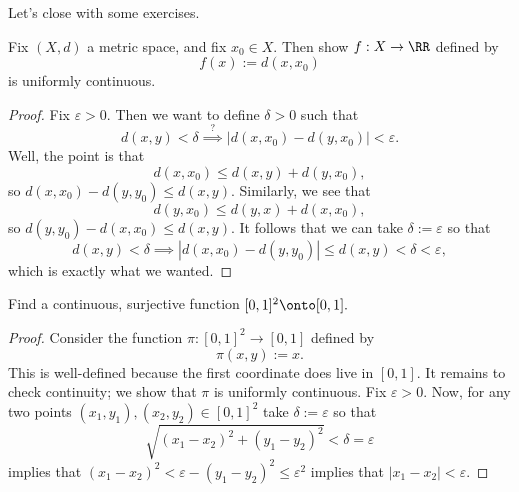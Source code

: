 \documentclass[../notes.tex]{subfiles}
\begin{document}
Let's close with some exercises.
\begin{exercise}
	Fix $(X,d)$ a metric space, and fix $x_0\in X.$ Then show $f:X\to\RR$ defined by
	\[f(x):=d(x,x_0)\]
	is uniformly continuous.
\end{exercise}
\begin{proof}
	Fix $\varepsilon>0.$ Then we want to define $\delta>0$ such that
	\[d(x,y)<\delta\stackrel?\implies|d(x,x_0)-d(y,x_0)|<\varepsilon.\]
	Well, the point is that
	\[d(x,x_0)\le d(x,y)+d(y,x_0),\]
	so $d(x,x_0)-d(y,y_0)\le d(x,y).$ Similarly, we see that
	\[d(y,x_0)\le d(y,x)+d(x,x_0),\]
	so $d(y,y_0)-d(x,x_0)\le d(x,y).$ It follows that we can take $\delta:=\varepsilon$ so that
	\[d(x,y)<\delta\implies|d(x,x_0)-d(y,y_0)|\le d(x,y)<\delta<\varepsilon,\]
	which is exactly what we wanted.
\end{proof}
\begin{exercise}[Ross 21.9]
	Find a continuous, surjective function $[0,1]^2\onto[0,1].$
\end{exercise}
\begin{proof}
	Consider the function $\pi:[0,1]^2\to[0,1]$ defined by
	\[\pi(x,y):=x.\]
	This is well-defined because the first coordinate does live in $[0,1].$ It remains to check continuity; we show that $\pi$ is uniformly continuous. Fix $\varepsilon>0.$ Now, for any two points $(x_1,y_1),(x_2,y_2)\in[0,1]^2$ take $\delta:=\varepsilon$ so that
	\[\sqrt{(x_1-x_2)^2+(y_1-y_2)^2}<\delta=\varepsilon\]
	implies that $(x_1-x_2)^2<\varepsilon-(y_1-y_2)^2\le\varepsilon^2$ implies that $|x_1-x_2|<\varepsilon.$
\end{proof}
\end{document}

